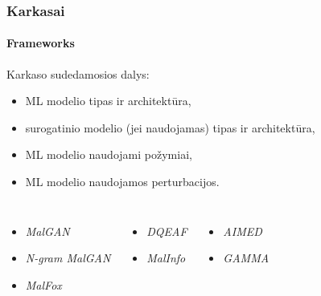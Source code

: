 \documentclass[12pt]{beamer}
\begin{document}
\begin{frame}
    \frametitle{Karkasai}
    \framesubtitle{Frameworks}
    Karkaso sudedamosios dalys:
    \begin{itemize}
        \item ML modelio tipas ir architektūra, \pause
        \item surogatinio modelio (jei naudojamas) tipas ir architektūra, \pause
        \item ML modelio naudojami požymiai, \pause
        \item ML modelio naudojamos perturbacijos.
    \end{itemize}\pause
    \vspace{20pt}
    \begin{columns}[t]
        \vspace{10pt}
        \begin{itemize}
            \item \textit{MalGAN}
            \item \textit{N-gram MalGAN}
            \item \textit{MalFox}
        \end{itemize}\pause
        \vspace{10pt}
        \begin{itemize}
            \item \textit{DQEAF}
            \item \textit{MalInfo}
        \end{itemize}\pause
        \vspace{10pt}
        \begin{itemize}
            \item \textit{AIMED}
            \item \textit{GAMMA}
        \end{itemize}
    \end{columns}
\end{frame}
\end{document}
